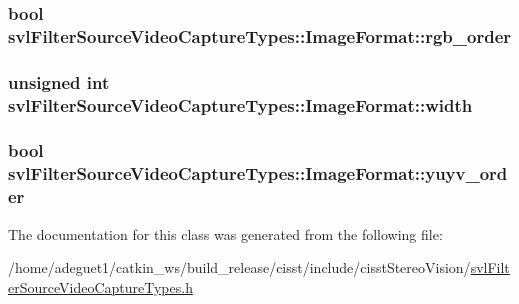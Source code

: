 \hypertarget{classsvl_filter_source_video_capture_types_1_1_image_format_a2fc3d0ae433e5def9e7f24d653ae8b47}{
\subsubsection[{rgb\-\_\-order}]{\setlength{\rightskip}{0pt plus 5cm}bool svl\-Filter\-Source\-Video\-Capture\-Types\-::\-Image\-Format\-::rgb\-\_\-order}}\label{classsvl_filter_source_video_capture_types_1_1_image_format_a2fc3d0ae433e5def9e7f24d653ae8b47}
\hypertarget{classsvl_filter_source_video_capture_types_1_1_image_format_a240891b8edeff025cfc146a8bf0f10c8}{
\subsubsection[{width}]{\setlength{\rightskip}{0pt plus 5cm}unsigned int svl\-Filter\-Source\-Video\-Capture\-Types\-::\-Image\-Format\-::width}}\label{classsvl_filter_source_video_capture_types_1_1_image_format_a240891b8edeff025cfc146a8bf0f10c8}
\hypertarget{classsvl_filter_source_video_capture_types_1_1_image_format_a7cbd79938ec75e77ea6cb6d8b0d414a0}{
\subsubsection[{yuyv\-\_\-order}]{\setlength{\rightskip}{0pt plus 5cm}bool svl\-Filter\-Source\-Video\-Capture\-Types\-::\-Image\-Format\-::yuyv\-\_\-order}}\label{classsvl_filter_source_video_capture_types_1_1_image_format_a7cbd79938ec75e77ea6cb6d8b0d414a0}


The documentation for this class was generated from the following file\-:\begin{DoxyCompactItemize}
\item 
/home/adeguet1/catkin\-\_\-ws/build\-\_\-release/cisst/include/cisst\-Stereo\-Vision/\hyperlink{svl_filter_source_video_capture_types_8h}{svl\-Filter\-Source\-Video\-Capture\-Types.\-h}\end{DoxyCompactItemize}
